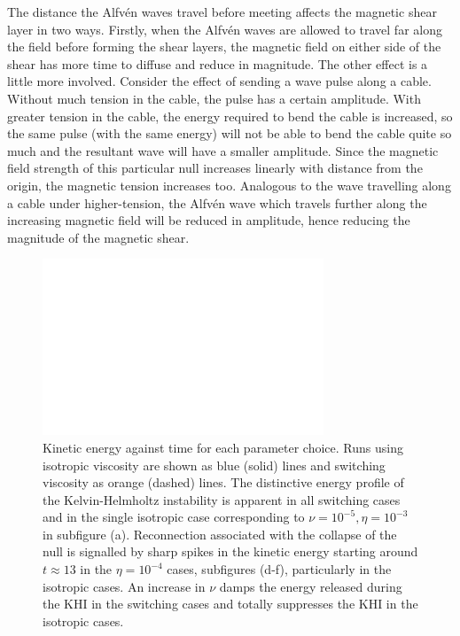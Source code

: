 The distance the Alfv\'en waves travel before meeting affects the magnetic shear layer in two ways. Firstly, when the Alfv\'en waves are allowed to travel far along the field before forming the shear layers, the magnetic field on either side of the shear has more time to diffuse and reduce in magnitude. The other effect is a little more involved. Consider the effect of sending a wave pulse along a cable. Without much tension in the cable, the pulse has a certain amplitude. With greater tension in the cable, the energy required to bend the cable is increased, so the same pulse (with the same energy) will not be able to bend the cable quite so much and the resultant wave will have a smaller amplitude. Since the magnetic field strength of this particular null increases linearly with distance from the origin, the magnetic tension increases too. Analogous to the wave travelling along a cable under higher-tension, the Alfv\'en wave which travels further along the increasing magnetic field will be reduced in amplitude, hence reducing the magnitude of the magnetic shear.

\begin{figure}[h]
  \centering
  \includegraphics[width=\linewidth]{param_study/kinetic_energies.pdf}
  \caption{Kinetic energy against time for each parameter choice. Runs using isotropic viscosity are shown as blue (solid) lines and switching viscosity as orange (dashed) lines. The distinctive energy profile of the Kelvin-Helmholtz instability is apparent in all switching cases and in the single isotropic case corresponding to $\nu = 10^{-5}, \eta = 10^{-3}$ in subfigure (a). Reconnection associated with the collapse of the null is signalled by sharp spikes in the kinetic energy starting around $t\approx13$ in the $\eta = 10^{-4}$ cases, subfigures (d-f), particularly in the isotropic cases. An increase in $\nu$ damps the energy released during the KHI in the switching cases and totally suppresses the KHI in the isotropic cases.}%
  \label{fig:param_study_kinetic_energies}
\end{figure}

